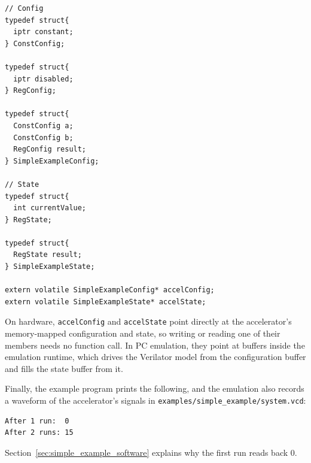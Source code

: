 \begin{lstlisting}
// Config
typedef struct{
  iptr constant;
} ConstConfig;

typedef struct{
  iptr disabled;
} RegConfig;

typedef struct{
  ConstConfig a;
  ConstConfig b;
  RegConfig result;
} SimpleExampleConfig;

// State
typedef struct{
  int currentValue;
} RegState;

typedef struct{
  RegState result;
} SimpleExampleState;

extern volatile SimpleExampleConfig* accelConfig;
extern volatile SimpleExampleState* accelState;
\end{lstlisting}

On hardware, \texttt{accelConfig} and \texttt{accelState} point directly at the accelerator's memory-mapped configuration and state, so writing or reading one of their members needs no function call. In PC emulation, they point at buffers inside the emulation runtime, which drives the Verilator model from the configuration buffer and fills the state buffer from it.

Finally, the example program prints the following, and the emulation also records a waveform of the accelerator's signals in \texttt{examples/simple\_example/system.vcd}:

\begin{lstlisting}
After 1 run:  0
After 2 runs: 15
\end{lstlisting}

Section~\ref{sec:simple_example_software} explains why the first run reads back 0.
